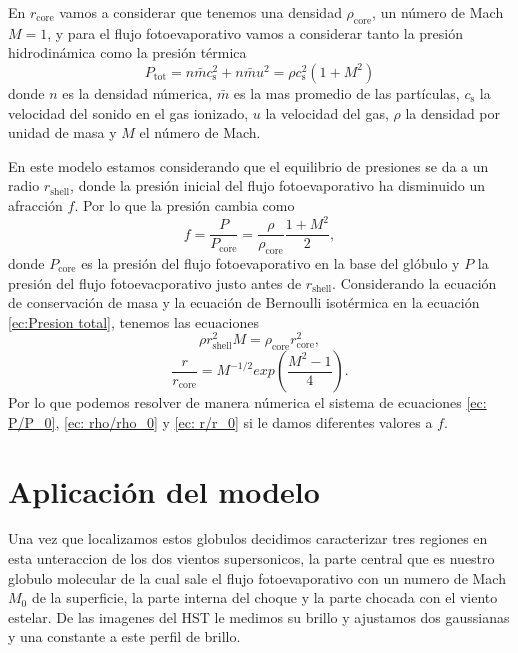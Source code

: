 \documentclass[twocolumn, times]{aastex631}
\begin{document}
En $r_\mathrm{core}$ vamos a considerar que tenemos una densidad $\rho_\mathrm{core}$, un número de Mach $M=1$, y para el flujo fotoevaporativo vamos a considerar tanto la presión hidrodinámica como la presión térmica
\begin{equation}\label{ec:Presion total}
    P_\mathrm{tot}=n\bar{m}c_\mathrm{s}^2+n\bar{m}u^2=\rho c_\mathrm{s}^2(1+M^2)
\end{equation}
donde $n$ es la densidad númerica, $\bar{m}$ es la mas promedio de las partículas, $c_\mathrm{s}$ la velocidad del sonido en el gas ionizado, $u$ la velocidad del gas, $\rho$ la densidad por unidad de masa y $M$ el número de Mach.

En este modelo estamos considerando que el equilibrio de presiones se da a un radio $r_\mathrm{shell}$, donde la presión inicial del flujo fotoevaporativo ha disminuido un afracción $f$. Por lo que la presión cambia como
\begin{equation} \label{ec: P/P_0}
    f=\frac{P}{P_\mathrm{core}}=\frac{\rho}{\rho_\mathrm{core}}\frac{1+M^2}{2},
\end{equation}
donde $P_\mathrm{core}$ es la presión del flujo fotoevaporativo en la base del glóbulo y $P$ la presión del flujo fotoevacporativo justo antes de $r_\mathrm{shell}$. Considerando la ecuación de conservación de masa y la ecuación de Bernoulli isotérmica en la ecuación \ref{ec:Presion total}, tenemos las ecuaciones
\begin{equation}\label{ec: rho/rho_0}
    \rho r_\mathrm{shell}^2M=\rho_\mathrm{core}r_\mathrm{core}^2,
\end{equation}
\begin{equation}\label{ec: r/r_0}
    \frac{r}{r_\mathrm{core}}=M^{-1/2}exp\left(\frac{M^2-1}{4}\right).
\end{equation}
Por lo que podemos resolver de manera númerica el sistema de ecuaciones \ref{ec: P/P_0}, \ref{ec: rho/rho_0} y \ref{ec: r/r_0} si le damos diferentes valores a $f$.

\section{Aplicación del modelo}
\label{Sec:Aplicacioin}

Una vez que localizamos estos globulos decidimos caracterizar tres regiones en esta unteraccion de los dos vientos supersonicos, la parte central que es nuestro globulo molecular de la cual sale el flujo fotoevaporativo con un numero de Mach $M_0$ de la superficie, la parte interna del choque y la parte chocada con el viento estelar. De las imagenes del HST le medimos su brillo y ajustamos dos gaussianas y una constante a este perfil de brillo.
\end{document}
